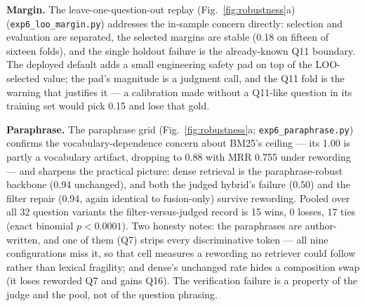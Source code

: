 \documentclass[preprint,12pt]{elsarticle}
\begin{document}
\textbf{Margin.} The leave-one-question-out replay
(Fig.~\ref{fig:robustness}a)
(\texttt{exp6\_loo\_margin.py}) addresses the in-sample concern directly:
selection and evaluation are separated, the selected margins are stable
(0.18 on fifteen of sixteen folds), and the single holdout failure is the
already-known Q11 boundary. The deployed default adds a small engineering
safety pad on top of the LOO-selected value; the pad's magnitude is a
judgment call, and the Q11 fold is the warning that justifies it --- a
calibration made without a Q11-like question in its training set would
pick 0.15 and lose that gold.

\textbf{Paraphrase.} The paraphrase grid
(Fig.~\ref{fig:robustness}a; \texttt{exp6\_paraphrase.py})
confirms the vocabulary-dependence concern about BM25's ceiling --- its
1.00 is partly a vocabulary artifact, dropping to 0.88 with MRR 0.755
under rewording --- and sharpens the practical picture: dense retrieval is
the paraphrase-robust backbone (0.94 unchanged), and both the judged
hybrid's failure (0.50) and the filter repair (0.94, again identical to
fusion-only) survive rewording. Pooled over all 32 question variants the
filter-versus-judged record is 15 wins, 0 losses, 17 ties (exact binomial
$p < 0.0001$). Two honesty notes: the paraphrases are author-written, and
one of them (Q7) strips every discriminative token --- all nine
configurations miss it, so that cell measures a rewording no retriever
could follow rather than lexical fragility; and dense's unchanged rate
hides a composition swap (it loses reworded Q7 and gains Q16). The
verification failure is a property of
the judge and the pool, not of the question phrasing.
\end{document}
